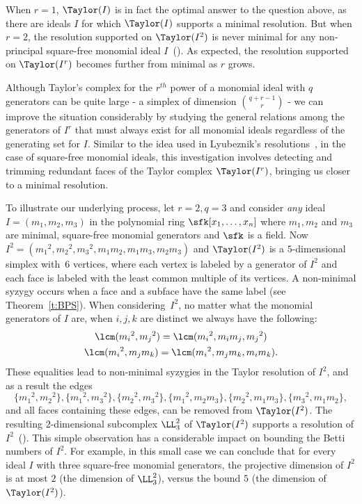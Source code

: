 When $r=1$, $\Taylor(I)$ is in fact the optimal answer to the question
above, as there are ideals $I$ for which $\Taylor(I)$ supports a
minimal resolution.  But when $r=2$, the resolution supported on
$\Taylor(I^2)$ is never minimal for any non-principal square-free
monomial ideal $I$~\textup{(}\cite{L2}\textup{)}.  As expected, the resolution supported on $\Taylor(I^r)$
becomes further from minimal as $r$ grows.

Although Taylor's complex for the $r^{th}$ power of a monomial ideal
with $q$ generators can be quite large - a simplex of dimension
$\binom{q+r-1}{r}$ - we can improve the situation considerably by
studying the general relations among the generators of $I^r$ that must
always exist for all monomial ideals regardless of the generating set
for $I$.  Similar to the idea used in Lyubeznik's
resolutions~\cite{L}, in the case of square-free monomial ideals, this
investigation involves detecting and trimming redundant faces of the
Taylor complex $\Taylor(I^r)$, bringing us closer to a minimal
resolution.

To illustrate our underlying process, let $r=2, q=3$ and consider {\it
  any} ideal $I = (m_1, m_2, m_3)$ in the polynomial ring $\sfk[x_1,
  \ldots, x_n]$ where $m_1, m_2$ and $m_3$ are minimal, square-free
monomial generators and $\sfk$ is a field.  Now $I^2 = ({m_1}^2,
{m_2}^2, {m_3}^2, m_1m_2, m_1m_3, m_2m_3)$ and $\Taylor(I^2)$ is a
$5$-dimensional simplex with~$6$ vertices, where each vertex is
labeled by a generator of $I^2$ and each face is labeled with the
least common multiple of its vertices. A non-minimal syzygy occurs
when a face and a subface have the same label \textup{(}see Theorem~\ref{t:BPS}\textup{)}. When
considering~$I^2$, no matter what the monomial generators of $I$ are,
when $i, j, k$ are distinct we always have the following: 
\begin{gather*}
\lcm({m_i}^2, {m_j}^2)=\lcm({{m_i}^2,m_im_j,{m_j}^2}) \\
\lcm({m_i}^2, m_jm_k)=\lcm({m_i}^2, m_jm_k,m_im_k).
\end{gather*} These equalities
lead to non-minimal syzygies in the Taylor resolution of $I^2$, and as
a result the edges
$$\{{m_1}^2, {m_2}^2\}, \{{m_1}^2, {m_3}^2\}, \{{m_2}^2, {m_3}^2\},
\{{m_1}^2, m_2m_3\}, \{{m_2}^2, m_1m_3\}, \{{m_3}^2, m_1m_2\},$$ and
all faces containing these edges, can be removed from
$\Taylor(I^2)$. The resulting $2$-dimensional subcomplex $\LL_3^2$ of
$\Taylor(I^2)$ supports a resolution of $I^2$~\textup{(}\cite{L2}\textup{)}. This
simple observation has a considerable impact on bounding the Betti numbers of
$I^2$. For example, in this small case we can conclude that for every
ideal $I$ with three square-free monomial generators, the projective
dimension of $I^2$ is at most $2$ \textup{(}the dimension of $\LL_3^2$\textup{)}, versus 
the bound $5$ \textup{(}the dimension of $\Taylor(I^2)$\textup{)}.


